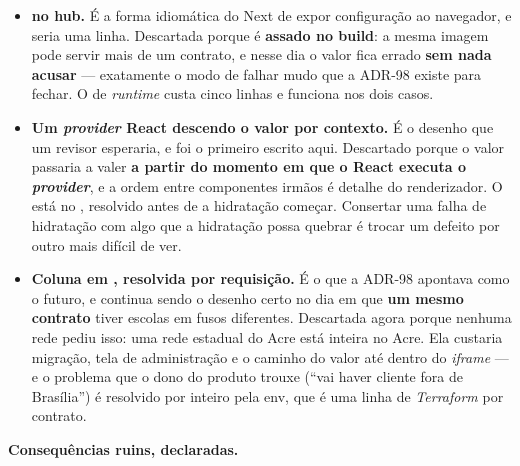 \begin{itemize}
  \item \textbf{ no hub.} É a forma
    idiomática do Next de expor configuração ao navegador, e seria uma linha.
    Descartada porque  é \textbf{assado no build}: a mesma
    imagem pode servir mais de um contrato, e nesse dia o valor fica errado
    \textbf{sem nada acusar} --- exatamente o modo de falhar mudo que a ADR-98
    existe para fechar. O  de \emph{runtime} custa cinco linhas e
    funciona nos dois casos.
  \item \textbf{Um \emph{provider} React descendo o valor por contexto.} É o
    desenho que um revisor esperaria, e foi o primeiro escrito aqui. Descartado
    porque o valor passaria a valer \textbf{a partir do momento em que o React
    executa o \emph{provider}}, e a ordem entre componentes irmãos é detalhe do
    renderizador. O  está no , resolvido antes de a
    hidratação começar. Consertar uma falha de hidratação com algo que a
    hidratação possa quebrar é trocar um defeito por outro mais difícil de ver.
  \item \textbf{Coluna  em , resolvida por requisição.} É o
    que a ADR-98 apontava como o futuro, e continua sendo o desenho certo no dia
    em que \textbf{um mesmo contrato} tiver escolas em fusos diferentes.
    Descartada agora porque nenhuma rede pediu isso: uma rede estadual do Acre
    está inteira no Acre. Ela custaria migração, tela de administração e o
    caminho do valor até dentro do \emph{iframe} --- e o problema que o dono do
    produto trouxe (\enquote{vai haver cliente fora de Brasília}) é resolvido
    por inteiro pela env, que é uma linha de \emph{Terraform} por contrato.
\end{itemize}

\textbf{Consequências ruins, declaradas.}

